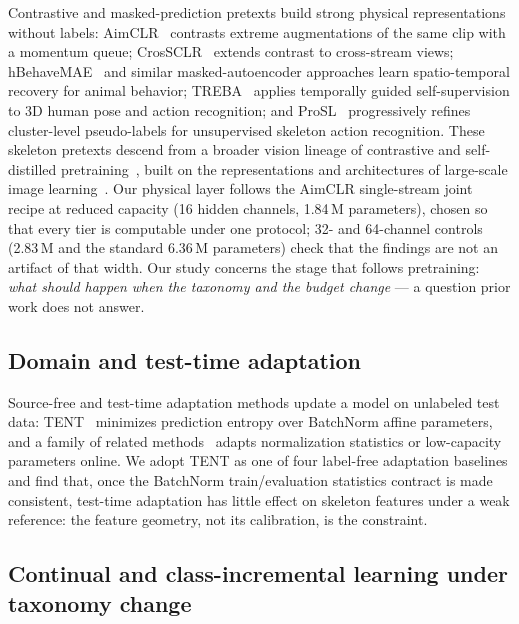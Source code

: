 \documentclass[preprint,12pt,number]{elsarticle}
\begin{document}
Contrastive and masked-prediction pretexts build strong physical
representations without labels: AimCLR~\cite{aimclr} contrasts extreme augmentations of
the same clip with a momentum queue; CrosSCLR~\cite{crossclr} extends contrast to
cross-stream views; hBehaveMAE~\cite{hbehavemae} and similar masked-autoencoder approaches
learn spatio-temporal recovery for animal behavior; TREBA~\cite{treba} applies
temporally guided self-supervision to 3D human pose and action recognition;
and ProSL~\cite{prosl} progressively refines cluster-level pseudo-labels for
unsupervised skeleton action recognition. These
skeleton pretexts descend from a broader vision lineage of contrastive and
self-distilled pretraining~\cite{moco,simclr,byol,clip,dinov2}, built on the representations and
architectures of large-scale image learning~\cite{alexnet,resnet}. Our physical layer
follows the AimCLR single-stream joint recipe at
reduced capacity (16 hidden channels, 1.84\,M parameters), chosen so that
every tier is computable under one protocol; 32- and 64-channel controls
(2.83\,M and the standard 6.36\,M parameters) check that the findings are not
an artifact of that width. Our study concerns the stage
that follows pretraining: \emph{what should happen when the taxonomy and the
budget change} --- a question prior work does not answer.

\subsection{Domain and test-time adaptation}

Source-free and test-time adaptation methods update a model on unlabeled test
data: TENT~\cite{tent} minimizes prediction entropy over BatchNorm affine parameters,
and a family of related methods~\cite{dann,bendavid,tta_distmatch,bituning} adapts normalization statistics or
low-capacity parameters online. We adopt TENT as one of four label-free
adaptation baselines and find that, once the BatchNorm train/evaluation
statistics contract is made consistent, test-time adaptation has little
effect on skeleton features under a weak reference: the feature geometry,
not its calibration, is the constraint.

\subsection{Continual and class-incremental learning under taxonomy change}
\end{document}
